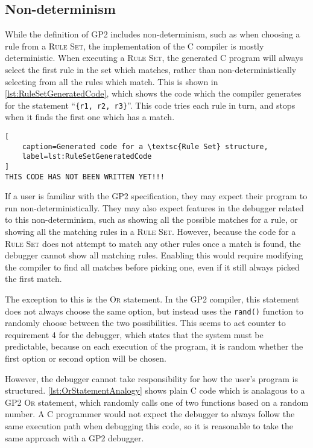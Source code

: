 \documentclass[authoryearcitations]{UoYCSproject}
\begin{document}
\subsection{Non-determinism}
\label{sec:Nondeterminism}

While the definition of GP2 includes non-determinism, such as when choosing a
rule from a \textsc{Rule Set}, the implementation of the C compiler is mostly
deterministic. When executing a \textsc{Rule Set}, the generated C program
will always select the first rule in the set which matches, rather than
non-deterministically selecting from all the rules which match. This is shown
in \autoref{lst:RuleSetGeneratedCode}, which shows the code which the compiler
generates for the statement ``\texttt{\{r1, r2, r3\}}''. This code tries each
rule in turn, and stops when it finds the first one which has a match.

\begin{lstlisting}[
    caption=Generated code for a \textsc{Rule Set} structure,
    label=lst:RuleSetGeneratedCode
]
THIS CODE HAS NOT BEEN WRITTEN YET!!!
\end{lstlisting}

If a user is familiar with the GP2 specification, they may expect their program
to run non-deterministically. They may also expect features in the debugger
related to this non-determinism, such as showing all the possible matches for
a rule, or showing all the matching rules in a \textsc{Rule Set}. However,
because the code for a \textsc{Rule Set} does not attempt to match any other
rules once a match is found, the debugger cannot show all matching rules.
Enabling this would require modifying the compiler to find all matches before
picking one, even if it still always picked the first match.

The exception to this is the \textsc{Or} statement. In the GP2 compiler, this
statement does not always choose the same option, but instead uses the
\texttt{rand()} function to randomly choose between the two possibilities.
This seems to act counter to requirement 4 for the debugger, which states
that the system must be predictable, because on each execution of the program,
it is random whether the first option or second option will be chosen.

However, the debugger cannot take responsibility for how the user's program
is structured. \autoref{lst:OrStatementAnalogy} shows plain C code which is
analagous to a GP2 \textsc{Or} statement, which randomly calls one of two
functions based on a random number. A C programmer would not expect the
debugger to always follow the same execution path when debugging this code,
so it is reasonable to take the same approach with a GP2 debugger.
\end{document}
